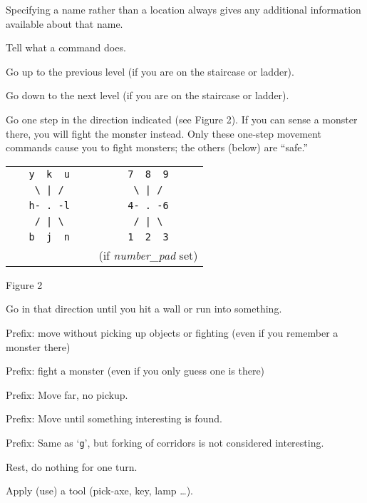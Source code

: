 Specifying a name rather than a location
always gives any additional information available about that name.
\item[\tb{\&}]
Tell what a command does.
\item[\tb{<}]
Go up to the previous level (if you are on the staircase or ladder).
\item[\tb{>}]
Go down to the next level (if you are on the staircase or ladder).
\item[\tb{[yuhjklbn]}]
Go one step in the direction indicated (see Figure 2).  If you can sense
a monster there, you will fight the monster instead.  Only these
one-step movement commands cause you to fight monsters; the others
(below) are ``safe.''
\begin{center}
\begin{tabular}{cc}
\verb+   y  k  u   + & \verb+   7  8  9   +\\
\verb+    \ | /    + & \verb+    \ | /    +\\
\verb+   h- . -l   + & \verb+   4- . -6   +\\
\verb+    / | \    + & \verb+    / | \    +\\
\verb+   b  j  n   + & \verb+   1  2  3   +\\
                     & (if {\it number\_pad\/} set)
\end{tabular}
\end{center}
\begin{center}
Figure 2
\end{center}
\item[\tb{[YUHJKLBN]}]
Go in that direction until you hit a wall or run into something.
\item[\tb{m[yuhjklbn]}]
Prefix:  move without picking up objects or fighting (even if you remember
a monster there)
\item[\tb{F[yuhjklbn]}]
Prefix:  fight a monster (even if you only guess one is there)
\item[\tb{M[yuhjklbn]}]
Prefix:  Move far, no pickup.
\item[\tb{g[yuhjklbn]}]
Prefix:  Move until something interesting is found.
\item[\tb{G[yuhjklbn] {\rm or} <CONTROL->[yuhjklbn]}]
Prefix:  Same as `{\tt g}', but forking of corridors is not considered
interesting.
\item[\tb{.}]
Rest, do nothing for one turn.
\item[\tb{a}]
Apply (use) a tool (pick-axe, key, lamp \ldots).

